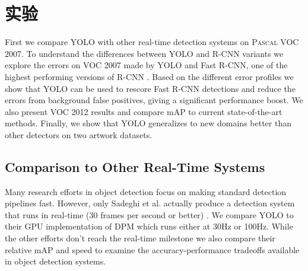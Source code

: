 \documentclass[10pt,twocolumn,letterpaper]{article}
\begin{document}
\section{实验}

First we compare YOLO with other real-time detection systems on \textsc{Pascal} VOC 2007. To understand the differences between YOLO and R-CNN variants we explore the errors on VOC 2007 made by YOLO and Fast R-CNN, one of the highest performing versions of R-CNN \cite{DBLP:journals/corr/Girshick15}. Based on the different error profiles we show that YOLO can be used to rescore Fast R-CNN detections and reduce the errors from background false positives, giving a significant performance boost. We also present VOC 2012 results and compare mAP to current state-of-the-art methods. Finally, we show that YOLO generalizes to new domains better than other detectors on two artwork datasets.

\subsection{Comparison to Other Real-Time Systems}

Many research efforts in object detection focus on making standard detection pipelines fast. \cite{dean2013fast} \cite{yan2014fastest} \cite{sadeghi201430hz} \cite{DBLP:journals/corr/Girshick15} \cite{he2014spatial} \cite{ren2015faster} However, only Sadeghi et al. actually produce a detection system that runs in real-time (30 frames per second or better) \cite{sadeghi201430hz}. We compare YOLO to their GPU implementation of DPM which runs either at 30Hz or 100Hz. While the other efforts don't reach the real-time milestone we also compare their relative mAP and speed to examine the accuracy-performance tradeoffs available in object detection systems.
\end{document}
